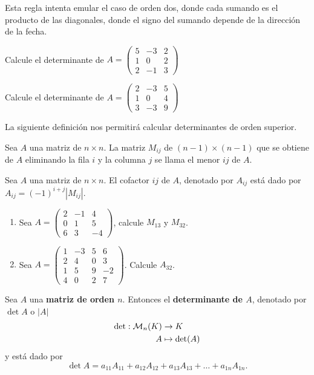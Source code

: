 Esta regla intenta emular el caso de orden dos, donde cada sumando es el producto de las diagonales, donde el signo del sumando depende de la direcci\'on de la fecha.

\begin{ejem}
Calcule el determinante de $A = \begin{pmatrix} 5 & -3 & 2 \\ 1 & 0 & 2 \\ 2 & -1 & 3 \end{pmatrix}$
\end{ejem}


\begin{ejem}
Calcule el determinante de $A = \begin{pmatrix} 2 & -3 & 5 \\ 1 & 0 & 4 \\ 3 & -3 & 9 \end{pmatrix}$
\end{ejem}

La siguiente definici\'on nos permitir\'a calcular determinantes de orden superior.
\begin{defin}
Sea $A$ una matriz de $n \times n$. La matriz $M_{ij}$ de $(n-1) \times (n-1)$ que se obtiene de $A$ eliminando la fila $i$ y la columna $j$ se llama el menor $ij$ de $A$.

Sea $A$ una matriz de $n \times n$. El cofactor $ij$ de $A$, denotado por $A_{ij}$ está dado por $A_{ij} = (-1)^{i+j}|M_{ij}|$.
\end{defin}

\begin{ejer}
\begin{enumerate}
    \item Sea $A = \begin{pmatrix} 2 & -1 & 4 \\ 0 & 1 & 5 \\ 6 & 3 & -4 \end{pmatrix}$, calcule $M_{13}$ y $M_{32}$.
    \item Sea $A = \begin{pmatrix} 1 & -3 & 5 & 6 \\ 2 & 4 & 0 & 3 \\ 1 & 5 & 9 & -2 \\ 4 & 0 & 2 & 7 \end{pmatrix}$. Calcule $A_{32}$.
\end{enumerate}
\end{ejer}


\begin{defin}
Sea $A$ una \textbf{matriz de orden $n$}. Entonces el \textbf{determinante de $A$}, denotado por $\det A$ o $|A|$
\begin{align*}
    \det: \mathcal{M}_{n}(K)&\to K\\
    A & \mapsto \det(A)
\end{align*}
y está dado por 
\[\det A = a_{11}A_{11}+a_{12}A_{12}+a_{13}A_{13} + \dots + a_{1n}A_{1n}.\]
\end{defin}

